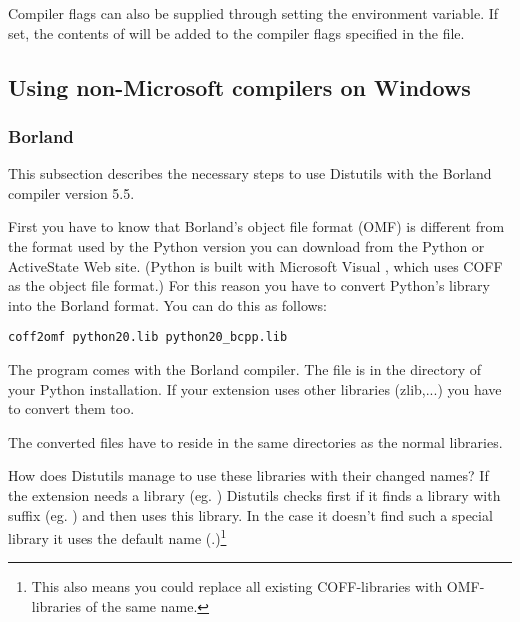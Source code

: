 \documentclass{howto}
\begin{document}
Compiler flags can also be supplied through setting the
 environment variable.  If set, the contents of
 will be added to the compiler flags specified in the 
 file.


\subsection{Using non-Microsoft compilers on Windows \label{non-ms-compilers}}

\subsubsection{Borland \Cpp}

This subsection describes the necessary steps to use Distutils with the 
Borland \Cpp{} compiler version 5.5.

First you have to know that Borland's object file format (OMF) is
different from the format used by the Python version you can download
from the Python or ActiveState Web site.  (Python is built with
Microsoft Visual \Cpp, which uses COFF as the object file format.)
For this reason you have to convert Python's library
 into the Borland format.  You can do this as
follows:

\begin{verbatim}
coff2omf python20.lib python20_bcpp.lib
\end{verbatim}

The  program comes with the Borland compiler.  The file
 is in the  directory of your Python
installation.  If your extension uses other libraries (zlib,...) you
have to convert them too.

The converted files have to reside in the same directories as the
normal libraries.

How does Distutils manage to use these libraries with their changed
names?  If the extension needs a library (eg. ) Distutils
checks first if it finds a library with suffix 
(eg. ) and then uses this library.  In the case it
doesn't find such a special library it uses the default name
(.)\footnote{This also means you could replace all
existing COFF-libraries with OMF-libraries of the same name.}
\end{document}
